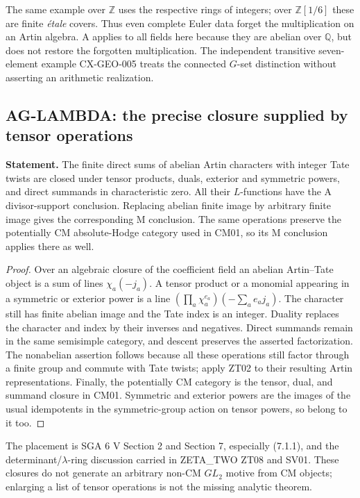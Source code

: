 The same example over $\mathbb Z$ uses the respective rings of integers;
over $\mathbb Z[1/6]$ these are finite \emph{\'etale} covers. Thus even
complete Euler data forget the multiplication on an Artin algebra. A
applies to all fields here because they are abelian over $\mathbb Q$,
but does not restore the forgotten multiplication. The independent
transitive seven-element example CX-GEO-005 treats the connected
$G$-set distinction without asserting an arithmetic realization.

\subsection{AG-LAMBDA: the precise closure supplied by tensor operations}
\label{ag:lambda}

\textbf{Statement.} The finite direct sums of abelian Artin characters with
integer Tate twists are closed under tensor products, duals, exterior and
symmetric powers, and direct summands in characteristic zero. All their
$L$-functions have the A divisor-support conclusion. Replacing abelian
finite image by arbitrary finite image gives the corresponding M conclusion.
The same operations preserve the potentially CM absolute-Hodge category
used in CM01, so its M conclusion applies there as well.

\begin{proof}
Over an algebraic closure of the coefficient field an abelian Artin--Tate
object is a sum of lines $\chi_a(-j_a)$. A tensor product or a monomial
appearing in a symmetric or exterior power is a line
$(\prod_a\chi_a^{e_a})(-\sum_a e_aj_a)$. The character still has finite
abelian image and the Tate index is an integer. Duality replaces the
character and index by their inverses and negatives. Direct summands remain
in the same semisimple category, and descent preserves the asserted
factorization. The nonabelian assertion follows because all these
operations still factor through a finite group and commute with Tate
twists; apply ZT02 to their resulting Artin representations. Finally, the
potentially CM category is the tensor, dual, and summand closure in CM01.
Symmetric and exterior powers are the images of the usual idempotents in
the symmetric-group action on tensor powers, so belong to it too.
\end{proof}

The placement is SGA 6 V Section 2 and Section 7, especially (7.1.1),
and the determinant/$\lambda$-ring discussion carried in ZETA\_TWO ZT08
and SV01. These closures do not generate an arbitrary non-CM $GL_2$
motive from CM objects; enlarging a list of tensor operations is not the
missing analytic theorem.

